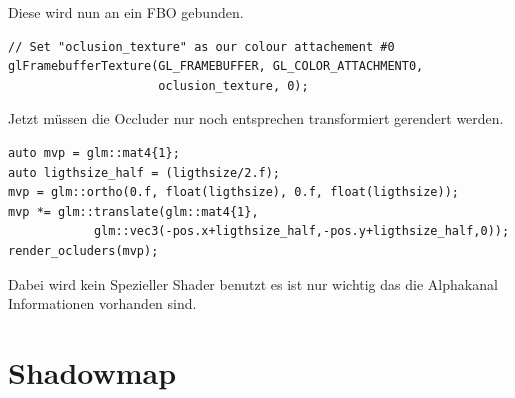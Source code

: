 Diese wird nun an ein FBO gebunden.
\begin{lstlisting}
// Set "oclusion_texture" as our colour attachement #0
glFramebufferTexture(GL_FRAMEBUFFER, GL_COLOR_ATTACHMENT0, 
					 oclusion_texture, 0);
\end{lstlisting}

Jetzt müssen die Occluder nur noch entsprechen transformiert gerendert werden.
\begin{lstlisting}
auto mvp = glm::mat4{1};
auto ligthsize_half = (ligthsize/2.f);
mvp = glm::ortho(0.f, float(ligthsize), 0.f, float(ligthsize));
mvp *= glm::translate(glm::mat4{1},
			glm::vec3(-pos.x+ligthsize_half,-pos.y+ligthsize_half,0));
render_ocluders(mvp);
\end{lstlisting}

Dabei wird kein Spezieller Shader benutzt es ist nur wichtig das die Alphakanal Informationen vorhanden sind.

\section{Shadowmap}

